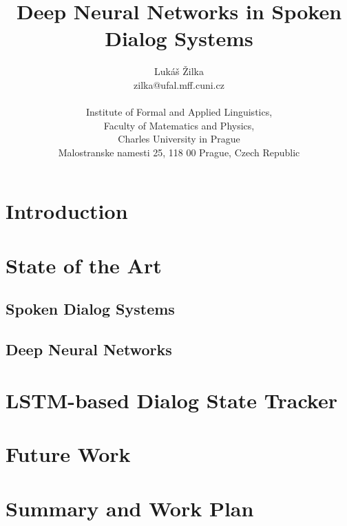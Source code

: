 \documentclass[11pt]{article}
\title{Deep Neural Networks in Spoken Dialog Systems}
\author
{Lukáš Žilka\\
\normalsize{zilka@ufal.mff.cuni.cz} \\
\\
\normalsize{Institute of Formal and Applied Linguistics,}\\
\normalsize{Faculty of Matematics and Physics,}\\
\normalsize{Charles University in Prague}\\
\normalsize{Malostranske namesti 25, 118 00 Prague, Czech Republic}\\
}
\date{}
\begin{document}



\maketitle


\section{Introduction}

\section{State of the Art}
\subsection{Spoken Dialog Systems}

\subsection{Deep Neural Networks}

\section{LSTM-based Dialog State Tracker}

\section{Future Work}


\section{Summary and Work Plan}





\end{document}
